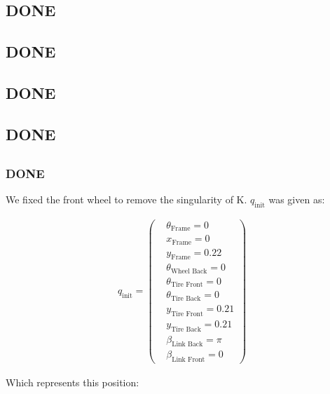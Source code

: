 \subsection{DONE}
\subsection{DONE}
\subsection{DONE}
\subsection{DONE}
\subsection{}
\subsubsection{DONE}
We fixed the front wheel to remove the singularity of K. $q_{\text{init}}$  was given as:

\begin{equation}\label{eq:4.5.1}
    \begin{split}
        q_{\text{init}} = 
        \begin{pmatrix}
            &\theta_{\text{Frame}} = 0\\
            &x_{\text{Frame}} = 0\\
            &y_{\text{Frame}} = 0.22\\
            &\theta_{\text{Wheel Back}} = 0\\
            &\theta_{\text{Tire Front}} = 0\\
            &\theta_{\text{Tire Back}} = 0\\
            &y_{\text{Tire Front}} = 0.21\\
            &y_{\text{Tire Back}} = 0.21\\
            &\beta_{\text{Link Back}} = \pi\\
            &\beta_{\text{Link Front}} = 0
        \end{pmatrix}
    \end{split}
\end{equation}

Which represents this position:


